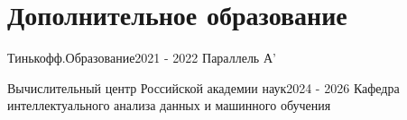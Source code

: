 \section{\textbf{Дополнительное образование}}
\resumeSubHeadingListStart

\resumeSubHeading
{Тинькофф.Образование}{2021 - 2022}
{Параллель А'}

\resumeSubHeading
{Вычислительный центр Российской академии наук}{2024 - 2026}
{Кафедра интеллектуального анализа данных и машинного обучения}

\resumeSubHeadingListEnd
